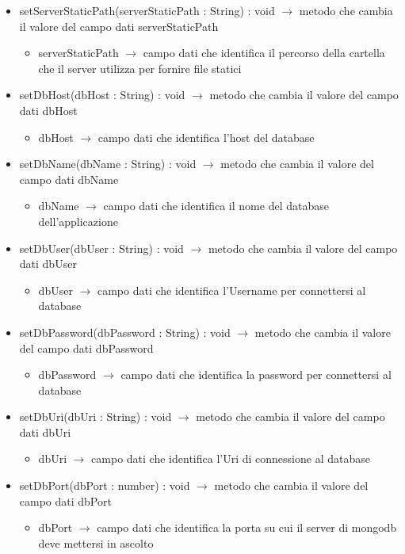 \begin{description}
\begin{itemize}
	\item setServerStaticPath(serverStaticPath : String) : void $\rightarrow$ metodo che cambia il valore del campo dati serverStaticPath\begin{itemize}
		\item serverStaticPath $\rightarrow$ campo dati che identifica il percorso della cartella che il server utilizza per fornire file statici
	\end{itemize}
	
	\item setDbHost(dbHost : String) : void $\rightarrow$ metodo che cambia il valore del campo dati dbHost\begin{itemize}
		\item dbHost $\rightarrow$ campo dati che identifica l'host del database
	\end{itemize}
	
	\item setDbName(dbName : String) : void $\rightarrow$ metodo che cambia il valore del campo dati dbName\begin{itemize}
		\item dbName $\rightarrow$ campo dati che identifica il nome del database dell'applicazione
	\end{itemize}
	
	\item setDbUser(dbUser : String) : void $\rightarrow$ metodo che cambia il valore del campo dati dbUser\begin{itemize}
		\item dbUser $\rightarrow$ campo dati che identifica l'Username per connettersi al database
	\end{itemize}
	
	\item setDbPassword(dbPassword : String) : void $\rightarrow$ metodo che cambia il valore del campo dati dbPassword\begin{itemize}
		\item dbPassword $\rightarrow$ campo dati che identifica la password per connettersi al database
	\end{itemize}
	
	\item setDbUri(dbUri : String) : void $\rightarrow$ metodo che cambia il valore del campo dati dbUri\begin{itemize}
		\item dbUri $\rightarrow$ campo dati che identifica l'Uri di connessione al database
	\end{itemize}
	
	\item setDbPort(dbPort : number) : void $\rightarrow$ metodo che cambia il valore del campo dati dbPort\begin{itemize}
		\item dbPort $\rightarrow$ campo dati che identifica la porta su cui il server di mongodb deve mettersi in ascolto
	\end{itemize}
	
\end{itemize}

\end{description}

